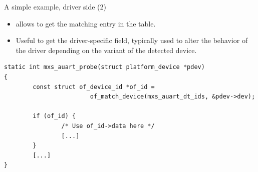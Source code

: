 \documentclass[obeyspaces,spaces,hyphens]{beamer}
\begin{document}
\begin{frame}[fragile]{A simple example, driver side (2)}
  \begin{itemize}
  \item {} allows to get the matching entry in the
     table.
  \item Useful to get the driver-specific  field, typically
    used to alter the behavior of the driver depending on the variant
    of the detected device.
  \end{itemize}
  \begin{center}
    \begin{block}{}
      \begin{verbatim}
static int mxs_auart_probe(struct platform_device *pdev)
{
        const struct of_device_id *of_id =
                        of_match_device(mxs_auart_dt_ids, &pdev->dev);

        if (of_id) {
                /* Use of_id->data here */
                [...]
        }
        [...]
}
\end{verbatim}
\end{block}
\end{center}
\end{frame}
\end{document}
